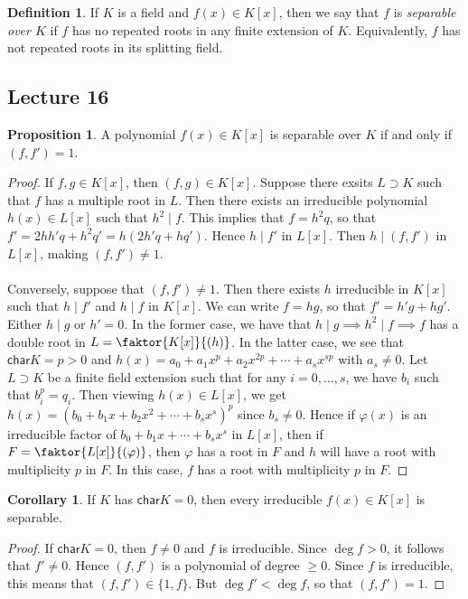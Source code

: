 \documentclass[10pt,letterpaper,cm]{nupset}
\theoremstyle{definition}
\newtheorem*{definition}{Definition}
\newtheorem{prop}{Proposition}
\newtheorem{corollary}{Corollary}
\newcommand{\1}{\mathbf{1}}
\newcommand{\0}{\vec 0}
\newcommand{\Char}{\mathsf{char}}
\begin{document}
\begin{definition}
If $K$ is a field and $f(x) \in K[x]$, then we say that $f$ is \textit{separable over $K$} if $f$ has no repeated roots in any finite extension of $K$. Equivalently, $f$ has not repeated roots in its splitting field.
\end{definition}

\subsection{Lecture 16}

\begin{prop}
A polynomial $f(x) \in K[x]$ is separable over $K$ if and only if $(f, f') =1$.
\end{prop}
\begin{proof}
If $f,g \in K[x]$, then $(f,g) \in K[x]$. Suppose there exsits $L \supset K$ such that $f$ has a multiple root in $L$. Then there exists an irreducible polynomial $h(x) \in L[x]$ such that $h^2 \mid f$. This implies that $f = h^2q$, so that $f' = 2hh'q +h^2q' = h(2h'q+hq')$. Hence $h \mid f'$ in $L[x]$. Then $h \mid (f,f')$ in $L[x]$, making $(f,f') \ne 1$.
\\ \\ 
Conversely, suppose that $(f,f') \ne 1$. Then there exists $h$ irreducible in $K[x]$ such that $h\mid f'$ and $h \mid f$ in $K[x]$. We can write $f=hg$, so that $f' = h'g + hg'$. Either $h \mid g$ or $h'=0$. In the former case, we have that $h \mid g \implies h^2 \mid f \implies f$ has a double root in $L = \faktor{K[x]}{(h)}$. In the latter case, we see that $\Char{K} = p>0$ and $h(x) = a_0 + a_1x^p + a_2x^{2p} + \cdots + a_sx^{sp}$ with $a_s \ne 0$. Let $L \supset K$ be a finite field extension such that for any $i=0, \ldots, s$, we have $b_i$ such that $b_i^p = q_i$. Then viewing $h(x) \in L[x]$, we get $h(x) = (b_0 + b_1x + b_2x^2 + \cdots + b_sx^s)^p$ since $b_s \ne 0$. Hence if $\varphi(x)$ is an irreducible factor of $b_0 + b_1x + \cdots + b_sx^s$ in $L[x]$, then if $F = \faktor{L[x]}{(\varphi)}$, then $\varphi$ has a root in $F$ and $h$ will have a root with multiplicity $p$ in $F$. In this case, $f$ has a root with multiplicity $p$ in $F$.
\end{proof}

\begin{corollary}
If $K$ has $\Char{K} =0$, then every irreducible $f(x) \in K[x]$ is separable. 
\end{corollary}
\begin{proof}
If $\Char{K}=0$, then $f \ne 0$ and $f$ is irreducible. Since $\deg{f} >0$, it follows that $f' \ne 0$. Hence $(f,f')$ is a polynomial of degree $\geq 0$. Since $f$ is irreducible, this means that $(f,f') \in \{1, f\}$. But $\deg{f'} < \deg{f}$, so that $(f,f') =1$.
\end{proof}
\end{document}
